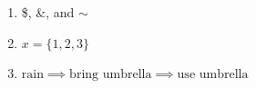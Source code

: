 \begin{enumerate}
    \item \$, \&, and $\sim$
    \item $x=\{1,2,3\}$
    \item $\text{rain} \implies \text{bring umbrella} \implies \text{use umbrella}$
\end{enumerate}